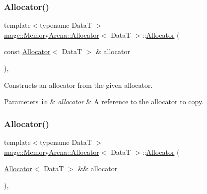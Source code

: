 \subsubsection{\texorpdfstring{Allocator()}{Allocator()}\hspace{0.1cm}{\footnotesize\ttfamily [1/4]}}
{\footnotesize\ttfamily template$<$typename DataT $>$ \\
\mbox{\hyperlink{classmage_1_1_memory_arena_1_1_allocator}{mage\+::\+Memory\+Arena\+::\+Allocator}}$<$ DataT $>$\+::\mbox{\hyperlink{classmage_1_1_memory_arena_1_1_allocator}{Allocator}} (\begin{DoxyParamCaption}\item[{const \mbox{\hyperlink{classmage_1_1_memory_arena_1_1_allocator}{Allocator}}$<$ DataT $>$ \&}]{allocator }\end{DoxyParamCaption})\hspace{0.3cm}{\ttfamily [default]}, {\ttfamily [noexcept]}}

Constructs an allocator from the given allocator.


\begin{DoxyParams}[1]{Parameters}
\mbox{\tt in}  & {\em allocator} & A reference to the allocator to copy. \\
\hline
\end{DoxyParams}
\mbox{\label{classmage_1_1_memory_arena_1_1_allocator_a54ddc035b0987d71776c54a1240be18d}} 
\subsubsection{\texorpdfstring{Allocator()}{Allocator()}\hspace{0.1cm}{\footnotesize\ttfamily [2/4]}}
{\footnotesize\ttfamily template$<$typename DataT $>$ \\
\mbox{\hyperlink{classmage_1_1_memory_arena_1_1_allocator}{mage\+::\+Memory\+Arena\+::\+Allocator}}$<$ DataT $>$\+::\mbox{\hyperlink{classmage_1_1_memory_arena_1_1_allocator}{Allocator}} (\begin{DoxyParamCaption}\item[{\mbox{\hyperlink{classmage_1_1_memory_arena_1_1_allocator}{Allocator}}$<$ DataT $>$ \&\&}]{allocator }\end{DoxyParamCaption})\hspace{0.3cm}{\ttfamily [default]}, {\ttfamily [noexcept]}}

